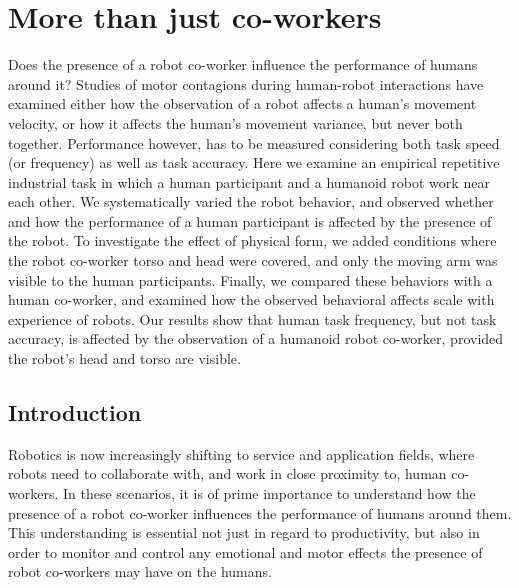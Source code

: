 \documentclass[a4paper, 12pt, oneside]{Thesis}  %
\begin{document}

\chapter{More than just co-workers}
Does the presence of a robot co-worker influence the performance of humans around it? Studies of motor contagions during human-robot interactions have examined either how the observation of a robot affects a human's movement velocity, or how it affects the human's movement variance, but never both together. Performance however, has to be measured considering both task speed (or frequency) as well as task accuracy. Here we examine an empirical repetitive industrial task in which a human participant and a humanoid robot work near each other. We systematically varied the robot behavior, and observed whether and how the performance of a human participant is affected by the presence of the robot. To investigate the effect of physical form, we added conditions where the robot co-worker torso and head were covered, and only the moving arm was visible to the human participants. Finally, we compared these behaviors with a human co-worker, and examined how the observed behavioral affects scale with experience of robots. Our results show that human task frequency, but not task accuracy, is affected by the observation of a humanoid robot co-worker, provided the robot's head and torso are visible.

\clearpage
\section{Introduction}
Robotics is now increasingly shifting to service and application fields, where robots need to collaborate with, and work in close proximity to, human co-workers. In these scenarios, it is of prime importance to understand how the presence of a robot co-worker influences the performance of humans around them. This understanding is essential not just in regard to productivity, but also in order to monitor and control any emotional and motor effects the presence of robot co-workers may have on the humans.
\end{document}
